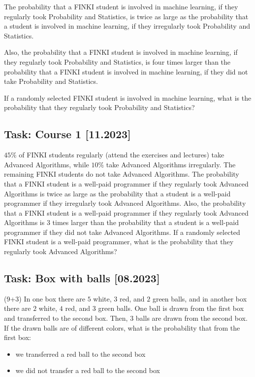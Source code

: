 \documentclass[a4paper, 12pt]{article}
\begin{document}
The probability that a FINKI student is involved in machine learning, if they regularly took Probability and Statistics, is twice as large as the probability that a student is involved in machine learning, if they irregularly took Probability and Statistics.

Also, the probability that a FINKI student is involved in machine learning, if they regularly took Probability and Statistics, is four times larger than the probability that a FINKI student is involved in machine learning, if they did not take Probability and Statistics.

If a randomly selected FINKI student is involved in machine learning, what is the probability that they regularly took Probability and Statistics?


\subsection*{Task: Course 1 [11.2023]}


$45\%$ of FINKI students regularly (attend the exercises and lectures) take Advanced Algorithms, while $10\%$ take Advanced Algorithms irregularly. The remaining FINKI students do not take Advanced Algorithms. The probability that a FINKI student is a well-paid programmer if they regularly took Advanced Algorithms is twice as large as the probability that a student is a well-paid programmer if they irregularly took Advanced Algorithms. Also, the probability that a FINKI student is a well-paid programmer if they regularly took Advanced Algorithms is $3$ times larger than the probability that a student is a well-paid programmer if they did not take Advanced Algorithms. If a randomly selected FINKI student is a well-paid programmer, what is the probability that they regularly took Advanced Algorithms?



\subsection*{Task: Box with balls [08.2023]}


(9+3) In one box there are $5$ white, $3$ red, and $2$ green balls, and in another box there are $2$ white, $4$ red, and $3$ green balls. One ball is drawn from the first box and transferred to the second box. Then, $3$ balls are drawn from the second box. If the drawn balls are of different colors, what is the probability that from the first box:

\begin{itemize}
    \item [a)] we transferred a red ball to the second box
    \item [b)] we did not transfer a red ball to the second box
\end{itemize}
\end{document}
